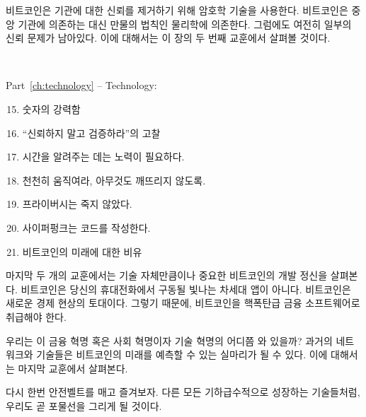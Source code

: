 \begin{comment}
	Cryptography is what Bitcoin uses to remove trust in authorities.
	Instead of relying on centralized institutions, the system relies on the final
	authority of our universe: physics. Some grains of trust still remain, however.
	We will examine these grains in the second lesson of this chapter.
\end{comment}
비트코인은 기관에 대한 신뢰를 제거하기 위해 암호학 기술을 사용한다.
비트코인은 중앙 기관에 의존하는 대신 만물의 법칙인 물리학에 의존한다.
그럼에도 여전히 일부의 신뢰 문제가 남아있다.
이에 대해서는 이 장의 두 번째 교훈에서 살펴볼 것이다.

~

\begin{samepage}
	Part~\ref{ch:technology} -- Technology:
	
	\begin{enumerate}
		\setcounter{enumi}{14}
		\item 숫자의 강력함
		\item \enquote{신뢰하지 말고 검증하라}의 고찰
		\item 시간을 알려주는 데는 노력이 필요하다.
		\item 천천히 움직여라, 아무것도 깨뜨리지 않도록.
		\item 프라이버시는 죽지 않았다.
		\item 사이퍼펑크는 코드를 작성한다.
		\item 비트코인의 미래에 대한 비유
	\end{enumerate}
\end{samepage}

\begin{comment}
	The last couple of lessons explore the ethos of technological development in
	Bitcoin, which is arguably as important as the technology itself. Bitcoin is not
	the next shiny app on your phone. It is the foundation of a new economic
	reality, which is why Bitcoin should be treated as nuclear-grade financial
	software.
\end{comment}
마지막 두 개의 교훈에서는 기술 자체만큼이나 중요한 비트코인의 개발 정신을 살펴본다.
비트코인은 당신의 휴대전화에서 구동될 빛나는 차세대 앱이 아니다.
비트코인은 새로운 경제 현상의 토대이다. 
그렇기 때문에, 비트코인을 핵폭탄급 금융 소프트웨어로 취급해야 한다.

\begin{comment}
	Where are we in this financial, societal, and technological revolution? 
	
	Networks and technologies of the past may serve as metaphors for Bitcoin's future, which
	are explored in the last lesson of this chapter.
\end{comment}
우리는 이 금융 혁명 혹은 사회 혁명이자 기술 혁명의 어디쯤 와 있을까?
과거의 네트워크와 기술들은 비트코인의 미래를 예측할 수 있는 실마리가 될 수 있다. 이에 대해서는 마지막 교훈에서 살펴본다. 

\begin{comment}
	Once more, strap in and enjoy the ride. Like all exponential technologies, we
	are about to go parabolic.
\end{comment}
다시 한번 안전벨트를 매고 즐겨보자. 다른 모든 기하급수적으로 성장하는 기술들처럼, 우리도 곧 포물선을 그리게 될 것이다.
